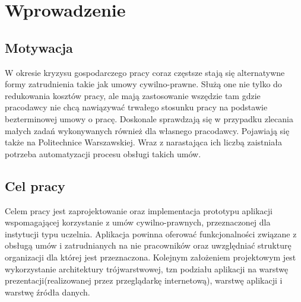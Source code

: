 \chapter{Wprowadzenie}

\section[Motywacja][Motywacja]{Motywacja}
W okresie kryzysu gospodarczego pracy coraz częstsze stają się alternatywne formy zatrudnienia takie jak umowy cywilno-prawne. Służą one nie tylko do redukowania kosztów pracy, ale mają zastosowanie wszędzie tam gdzie pracodawcy nie chcą nawiązywać trwałego stosunku pracy na podstawie bezterminowej umowy o pracę. Doskonale sprawdzają się w przypadku zlecania małych zadań wykonywanych również dla własnego pracodawcy. Pojawiają się także na Politechnice Warszawskiej. Wraz z narastająca ich liczbą zaistniała potrzeba automatyzacji procesu obsługi takich umów.

\section[Tytuł w paginie][Tytuł w spisie treści]{Cel pracy}
Celem pracy jest zaprojektowanie oraz implementacja prototypu aplikacji wspomagającej korzystanie z umów cywilno-prawnych, przeznaczonej dla instytucji typu uczelnia. Aplikacja powinna oferować funkcjonalności związane z obsługą umów i zatrudnianych na nie pracowników oraz uwzględniać strukturę organizacji dla której jest przeznaczona. Kolejnym założeniem projektowym jest wykorzystanie architektury trójwarstwowej, tzn podziału aplikacji na warstwę prezentacji(realizowanej przez przeglądarkę internetową), warstwę aplikacji i warstwę źródła danych.
